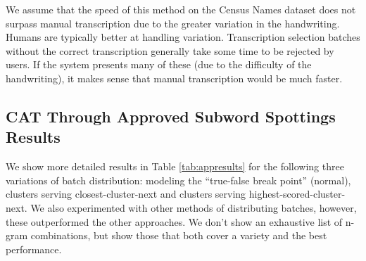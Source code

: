 \documentclass[ms,electronic,twosidetoc,letterpaper,chaptercenter,parttop,lof,lot]{byumsphd}
\begin{document}
We assume that the speed of this method on the Census Names dataset does not surpass manual transcription due to the greater variation in the handwriting. Humans are typically better at handling variation. Transcription selection batches without the correct transcription generally take some time to be rejected by users. If the system presents many of these (due to the difficulty of the handwriting), it makes sense that manual transcription would be much faster.

\subsection{CAT Through Approved Subword Spottings Results}

We show more detailed results in Table \ref{tab:appresults} for the following three variations of batch distribution: modeling the ``true-false break point'' (normal), clusters serving closest-cluster-next and clusters serving highest-scored-cluster-next. We also experimented with other methods of distributing batches, however, these outperformed the other approaches. We don't show an exhaustive list of n-gram combinations, but show those that both cover a variety and the best performance.
\end{document}
